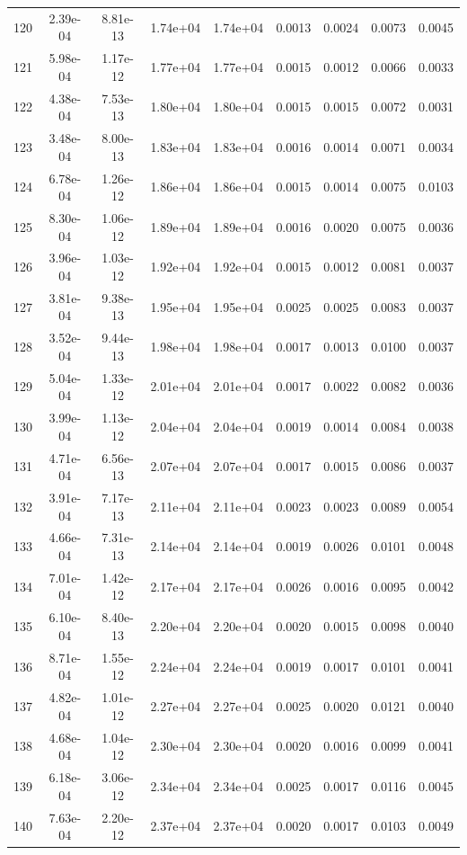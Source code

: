 \begin{longtable}{ccccccccc}
120 & 2.39e-04 & 8.81e-13 & 1.74e+04 & 1.74e+04 & 0.0013 & 0.0024 & 0.0073 & 0.0045 \\
121 & 5.98e-04 & 1.17e-12 & 1.77e+04 & 1.77e+04 & 0.0015 & 0.0012 & 0.0066 & 0.0033 \\
122 & 4.38e-04 & 7.53e-13 & 1.80e+04 & 1.80e+04 & 0.0015 & 0.0015 & 0.0072 & 0.0031 \\
123 & 3.48e-04 & 8.00e-13 & 1.83e+04 & 1.83e+04 & 0.0016 & 0.0014 & 0.0071 & 0.0034 \\
124 & 6.78e-04 & 1.26e-12 & 1.86e+04 & 1.86e+04 & 0.0015 & 0.0014 & 0.0075 & 0.0103 \\
125 & 8.30e-04 & 1.06e-12 & 1.89e+04 & 1.89e+04 & 0.0016 & 0.0020 & 0.0075 & 0.0036 \\
126 & 3.96e-04 & 1.03e-12 & 1.92e+04 & 1.92e+04 & 0.0015 & 0.0012 & 0.0081 & 0.0037 \\
127 & 3.81e-04 & 9.38e-13 & 1.95e+04 & 1.95e+04 & 0.0025 & 0.0025 & 0.0083 & 0.0037 \\
128 & 3.52e-04 & 9.44e-13 & 1.98e+04 & 1.98e+04 & 0.0017 & 0.0013 & 0.0100 & 0.0037 \\
129 & 5.04e-04 & 1.33e-12 & 2.01e+04 & 2.01e+04 & 0.0017 & 0.0022 & 0.0082 & 0.0036 \\
130 & 3.99e-04 & 1.13e-12 & 2.04e+04 & 2.04e+04 & 0.0019 & 0.0014 & 0.0084 & 0.0038 \\
131 & 4.71e-04 & 6.56e-13 & 2.07e+04 & 2.07e+04 & 0.0017 & 0.0015 & 0.0086 & 0.0037 \\
132 & 3.91e-04 & 7.17e-13 & 2.11e+04 & 2.11e+04 & 0.0023 & 0.0023 & 0.0089 & 0.0054 \\
133 & 4.66e-04 & 7.31e-13 & 2.14e+04 & 2.14e+04 & 0.0019 & 0.0026 & 0.0101 & 0.0048 \\
134 & 7.01e-04 & 1.42e-12 & 2.17e+04 & 2.17e+04 & 0.0026 & 0.0016 & 0.0095 & 0.0042 \\
135 & 6.10e-04 & 8.40e-13 & 2.20e+04 & 2.20e+04 & 0.0020 & 0.0015 & 0.0098 & 0.0040 \\
136 & 8.71e-04 & 1.55e-12 & 2.24e+04 & 2.24e+04 & 0.0019 & 0.0017 & 0.0101 & 0.0041 \\
137 & 4.82e-04 & 1.01e-12 & 2.27e+04 & 2.27e+04 & 0.0025 & 0.0020 & 0.0121 & 0.0040 \\
138 & 4.68e-04 & 1.04e-12 & 2.30e+04 & 2.30e+04 & 0.0020 & 0.0016 & 0.0099 & 0.0041 \\
139 & 6.18e-04 & 3.06e-12 & 2.34e+04 & 2.34e+04 & 0.0025 & 0.0017 & 0.0116 & 0.0045 \\
140 & 7.63e-04 & 2.20e-12 & 2.37e+04 & 2.37e+04 & 0.0020 & 0.0017 & 0.0103 & 0.0049 \\

\end{longtable}

